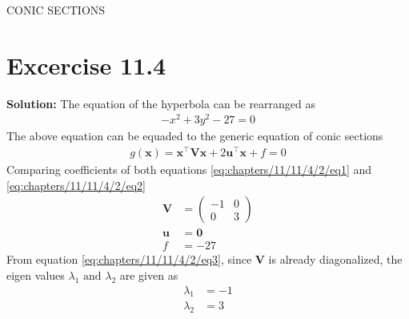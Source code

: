 \documentclass[12pt]{article}
\providecommand{\brak}[1]{\ensuremath{\left(#1\right)}}
\newcommand{\solution}{\noindent \textbf{Solution: }}
\newcommand{\myvec}[1]{\ensuremath{\begin{pmatrix}#1\end{pmatrix}}}
\let\vec\mathbf
\begin{document}
\begin{center}
\textbf\large{CONIC SECTIONS}

\end{center}
\section*{Excercise 11.4}
\solution
\fi
The equation of the hyperbola can be rearranged as
\begin{align}
	\label{eq:chapters/11/11/4/2/eq1}
	-x^2 + 3y^2 -27 = 0
\end{align}
The above equation can be equaded to the generic equation of conic sections
\begin{align}
	\label{eq:chapters/11/11/4/2/eq2}
	g\brak{\vec{x}}=\vec{x}^\top \vec{V} \vec{x} + 2\vec{u}^\top \vec{x} + f = 0
\end{align}
Comparing coefficients of both equations \eqref{eq:chapters/11/11/4/2/eq1} and \eqref{eq:chapters/11/11/4/2/eq2}
\begin{align}
	\label{eq:chapters/11/11/4/2/eq3}
	\vec{V} &= \myvec{-1&0\\0&3}\\
	\vec{u} &= \vec{0}\\
	f &= -27
\end{align}
From equation \eqref{eq:chapters/11/11/4/2/eq3}, since $\vec{V}$ is already diagonalized, the eigen values $\lambda_1 \text{ and } \lambda_2$ are given as
\begin{align}
	\lambda_1 &= -1\\
	\lambda_2 &= 3
\end{align}
\end{document}
